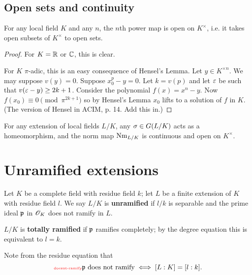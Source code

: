 \subsection{Open sets and continuity}
\begin{pr}
For any local field $K$ and any $n$, the $n$th power map is open on $K^{\times}$, i.e. it takes open subsets of $K^{\times}$ to open sets.
\end{pr}
\begin{proof}
For $K=\mathbb{R}$ or $\mathbb{C}$, this is clear.

For $K$ $\pi$-adic, this is an easy consequence of Hensel's Lemma. Let $y\in K^{\times n}$. We may suppose $v(y)=0$. Suppose $x_0^p-y=0$. Let $k=v(p)$ and
let $\varepsilon$ be such that $v(\varepsilon-y)\ge 2k+1$. Consider the polynomial $f(x)=x^n-y$. Now $f(x_0)\equiv 0\pmod{\pi^{2k+1}}$ so by Hensel's Lemma $x_0$ lifts to a solution of $f$ in $K$. (The version of Hensel in ACIM, p. 14. Add this in.)
\end{proof}
\begin{pr}
For any extension of local fields $L/K$, any $\sigma\in G(L/K)$ acts as a homeomorphism, and the norm map $\operatorname{Nm}_{L/K}$ is continuous and open on $K^{\times}$.
\end{pr}
\section{Unramified extensions}
\begin{df}
Let $K$ be a complete field with residue field $k$; let $L$ be a finite extension of $K$ with residue field $l$. We say $L/K$ is \textbf{unramified} if $l/k$ is separable and the prime ideal $\mathfrak{p}$ in $\mathscr{O}_K$ does not ramify in $L$.

$L/K$ is \textbf{totally ramified} if $\mathfrak{p}$ ramifies completely; by the degree equation this is equivalent to $l=k$.
\end{df}
Note from the residue equation that 
\begin{equation}\llabel{doesnt-ramify}
\mfp\text{ does not ramify} \iff [L:K]=[l:k].
\end{equation}


